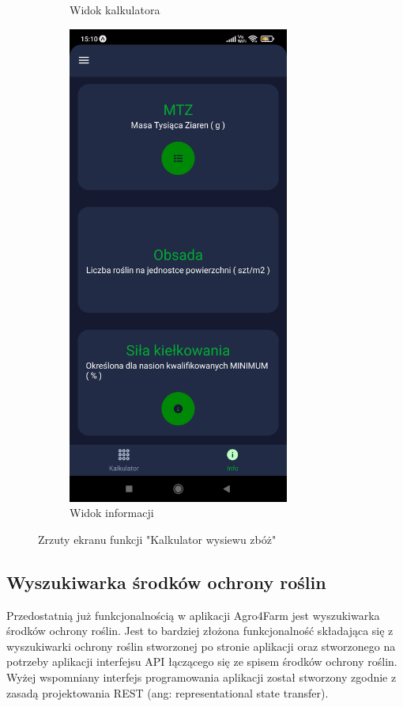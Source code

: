 \documentclass[a4paper,12pt,oneside]{book}
\begin{document}
\begin{figure}[H]
\begin{subfigure}{.5\textwidth}
			\caption{Widok kalkulatora}
		\end{subfigure}%
		\begin{subfigure}{.5\textwidth}
			\centering
			\includegraphics[width=0.8\textwidth]{grafika/kal_b.jpg}
			\caption{Widok informacji}
		\end{subfigure}
		\caption{Zrzuty ekranu funkcji "Kalkulator wysiewu zbóż"}
	\end{figure}
	
	\subsection{Wyszukiwarka środków ochrony roślin}
		Przedostatnią już funkcjonalnością w aplikacji Agro4Farm jest wyszukiwarka środków ochrony roślin. Jest to bardziej złożona funkcjonalność składająca się z wyszukiwarki ochrony roślin stworzonej po stronie aplikacji oraz stworzonego na potrzeby aplikacji interfejsu API łączącego się ze spisem środków ochrony roślin. Wyżej wspomniany interfejs programowania aplikacji został stworzony zgodnie z zasadą projektowania REST (ang: representational state transfer).
		
\end{document}
